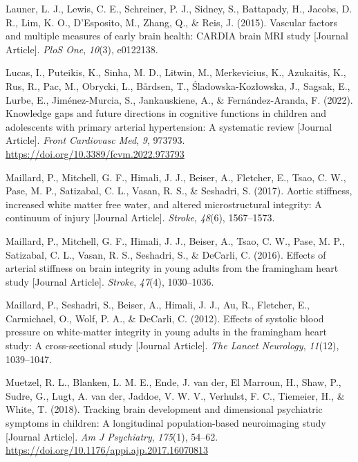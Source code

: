\documentclass[
  letterpaper,
  DIV=11,
  numbers=noendperiod]{scrreport}
\newlength{\cslhangindent}
\newenvironment{CSLReferences}[2] %
 {\begin{list}{}{%
  \setlength{\itemindent}{0pt}
  \setlength{\leftmargin}{0pt}
  \setlength{\parsep}{0pt}
  \ifodd #1
   \setlength{\leftmargin}{\cslhangindent}
   \setlength{\itemindent}{-1\cslhangindent}
  \fi
  \setlength{\itemsep}{#2\baselineskip}}}
 {\end{list}}
\begin{document}
\begin{CSLReferences}{1}{0}
Launer, L. J., Lewis, C. E., Schreiner, P. J., Sidney, S., Battapady,
H., Jacobs, D. R., Lim, K. O., D'Esposito, M., Zhang, Q., \& Reis, J.
(2015). Vascular factors and multiple measures of early brain health:
CARDIA brain MRI study {[}Journal Article{]}. \emph{PloS One},
\emph{10}(3), e0122138.

Lucas, I., Puteikis, K., Sinha, M. D., Litwin, M., Merkevicius, K.,
Azukaitis, K., Rus, R., Pac, M., Obrycki, L., Bårdsen, T.,
Śladowska-Kozłowska, J., Sagsak, E., Lurbe, E., Jiménez-Murcia, S.,
Jankauskiene, A., \& Fernández-Aranda, F. (2022). Knowledge gaps and
future directions in cognitive functions in children and adolescents
with primary arterial hypertension: A systematic review {[}Journal
Article{]}. \emph{Front Cardiovasc Med}, \emph{9}, 973793.
\url{https://doi.org/10.3389/fcvm.2022.973793}

Maillard, P., Mitchell, G. F., Himali, J. J., Beiser, A., Fletcher, E.,
Tsao, C. W., Pase, M. P., Satizabal, C. L., Vasan, R. S., \& Seshadri,
S. (2017). Aortic stiffness, increased white matter free water, and
altered microstructural integrity: A continuum of injury {[}Journal
Article{]}. \emph{Stroke}, \emph{48}(6), 1567--1573.

Maillard, P., Mitchell, G. F., Himali, J. J., Beiser, A., Tsao, C. W.,
Pase, M. P., Satizabal, C. L., Vasan, R. S., Seshadri, S., \& DeCarli,
C. (2016). Effects of arterial stiffness on brain integrity in young
adults from the framingham heart study {[}Journal Article{]}.
\emph{Stroke}, \emph{47}(4), 1030--1036.

Maillard, P., Seshadri, S., Beiser, A., Himali, J. J., Au, R., Fletcher,
E., Carmichael, O., Wolf, P. A., \& DeCarli, C. (2012). Effects of
systolic blood pressure on white-matter integrity in young adults in the
framingham heart study: A cross-sectional study {[}Journal Article{]}.
\emph{The Lancet Neurology}, \emph{11}(12), 1039--1047.

Muetzel, R. L., Blanken, L. M. E., Ende, J. van der, El Marroun, H.,
Shaw, P., Sudre, G., Lugt, A. van der, Jaddoe, V. W. V., Verhulst, F.
C., Tiemeier, H., \& White, T. (2018). Tracking brain development and
dimensional psychiatric symptoms in children: A longitudinal
population-based neuroimaging study {[}Journal Article{]}. \emph{Am J
Psychiatry}, \emph{175}(1), 54--62.
\url{https://doi.org/10.1176/appi.ajp.2017.16070813}


\end{CSLReferences}
\end{document}
